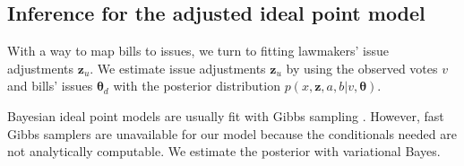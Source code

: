 

\subsection{Inference for the adjusted ideal point model}
\label{section:inference}
With a way to map bills to issues, we turn to fitting lawmakers'
issue adjustments $\bm z_u$.  We estimate issue adjustments $\bm z_u$
by using the observed votes $v$ and bills' issues $\bm \theta_d$ with
the posterior distribution $p(x, \bm z, a, b | v, \bm \theta).$

Bayesian ideal point models are usually fit with Gibbs sampling
\cite{johnson:1999ch6,jackman:2001,martin:2002,clinton:2004}. However,
fast Gibbs samplers are unavailable for our model because the
conditionals needed are not analytically computable.  We estimate the
posterior with variational Bayes.


